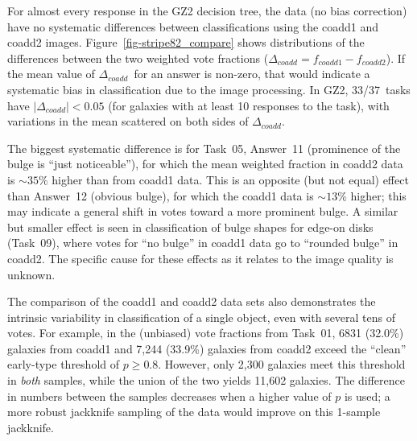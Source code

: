 \documentclass[useAMS,usenatbib]{mn2e}
\newcommand{\dcoadd}{$\Delta_{coadd}$}
\begin{document}

For almost every response in the GZ2 decision tree, the data (no bias correction) have no systematic differences between classifications using the coadd1 and coadd2 images. Figure~\ref{fig-stripe82_compare} shows distributions of the differences between the two weighted vote fractions ($\Delta_{coadd} = f_{coadd1} - f_{coadd2}$). If the mean value of \dcoadd~for an answer is non-zero, that would indicate a systematic bias in classification due to the image processing. In GZ2, 33/37~tasks have $|\Delta_{coadd}| < 0.05$ (for galaxies with at least 10 responses to the task), with variations in the mean scattered on both sides of \dcoadd. 

The biggest systematic difference is for Task~05, Answer~11 (prominence of the bulge is ``just noticeable''), for which the mean weighted fraction in coadd2 data is $\sim35\%$ higher than from coadd1 data. This is an opposite (but not equal) effect than Answer~12 (obvious bulge), for which the coadd1 data is $\sim13\%$ higher; this may indicate a general shift in votes toward a more prominent bulge. A similar but smaller effect is seen in classification of bulge shapes for edge-on disks (Task~09), where votes for ``no bulge'' in coadd1 data go to ``rounded bulge'' in coadd2. The specific cause for these effects as it relates to the image quality is unknown. 

The comparison of the coadd1 and coadd2 data sets also demonstrates the intrinsic variability in classification of a single object, even with several tens of votes. For example, in the (unbiased) vote fractions from Task~01, 6831 (32.0\%) galaxies from coadd1 and 7,244 (33.9\%) galaxies from coadd2 exceed the ``clean'' early-type threshold of $p\geq0.8$. However, only 2,300 galaxies meet this threshold in {\em both} samples, while the union of the two yields 11,602 galaxies. The difference in numbers between the samples decreases when a higher value of $p$ is used; a more robust jackknife sampling of the data would improve on this 1-sample jackknife. 
\end{document}
